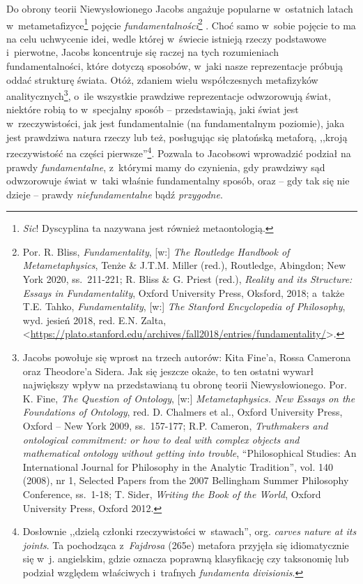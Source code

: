 Do obrony teorii Niewysłowionego Jacobs angażuje popularne w~ostatnich latach w~metametafizyce\footnote{\textit{Sic}! Dyscyplina ta nazywana jest również metaontologią.} pojęcie \textit{fundamentalności}\footnote{Por. R. Bliss, \textit{Fundamentality}, [w:] \textit{The Routledge Handbook of Metametaphysics}, Tenże \& J.T.M. Miller (red.), Routledge, Abingdon; New York 2020, ss.~211-221; R. Bliss \& G. Priest (red.), \textit{Reality and its Structure: Essays in Fundamentality}, Oxford University Press, Oksford, 2018; a~także T.E. Tahko, \textit{Fundamentality}, [w:] \textit{The Stanford Encyclopedia of Philosophy}, wyd. jesień 2018, red. E.N. Zalta, {\textless}\url{https://plato.stanford.edu/archives/fall2018/entries/fundamentality/}{\textgreater}.}
. Choć samo w~sobie pojęcie to ma na celu uchwycenie idei, wedle której w~świecie istnieją rzeczy podstawowe i~pierwotne, Jacobs koncentruje się raczej na tych rozumieniach fundamentalności, które dotyczą sposobów, w~jaki nasze reprezentacje próbują oddać strukturę świata. Otóż, zdaniem wielu współczesnych metafizyków analitycznych\footnote{Jacobs powołuje się wprost na trzech autorów: Kita Fine'a, Rossa Camerona oraz Theodore'a Sidera. Jak się jeszcze okaże, to ten ostatni wywarł największy wpływ na przedstawianą tu obronę teorii Niewysłowionego. Por. K. Fine, \textit{The Question of Ontology}, [w:] \textit{Metametaphysics. New Essays on the Foundations of Ontology}, red. D. Chalmers et al., Oxford University Press, Oxford -- New York 2009, ss.~157-177; R.P. Cameron, \textit{Truthmakers and ontological commitment: or how to deal with complex objects and mathematical ontology without getting into trouble}, ``Philosophical Studies: An International Journal for Philosophy in the Analytic Tradition'', vol. 140 (2008), nr 1, Selected Papers from the 2007 Bellingham Summer Philosophy Conference, ss.~1-18; T. Sider, \textit{Writing the Book of the World}, Oxford University Press, Oxford 2012.}, o~ile wszystkie prawdziwe reprezentacje odwzorowują świat, niektóre robią to w~specjalny sposób -- przedstawiają, jaki świat jest w~rzeczywistości, jak jest fundamentalnie (na fundamentalnym poziomie), jaka jest prawdziwa natura rzeczy lub też, posługując się platońską metaforą, ,,kroją rzeczywistość na części pierwsze''\footnote{Dosłownie ,,dzielą członki rzeczywistości w~stawach'', org. \textit{carves nature at its joints}. Ta pochodząca z~\textit{Fajdrosa} (265e) metafora przyjęła się idiomatycznie się w~j. angielskim, gdzie oznacza poprawną klasyfikację czy taksonomię lub podział względem właściwych i~trafnych \textit{fundamenta divisionis}.}. Pozwala to Jacobsowi wprowadzić podział na prawdy \textit{fundamentalne}, z~którymi mamy do czynienia, gdy prawdziwy sąd odwzorowuje świat w~taki właśnie fundamentalny sposób, oraz -- gdy tak się nie dzieje -- prawdy \textit{niefundamentalne} bądź \textit{przygodne}.

